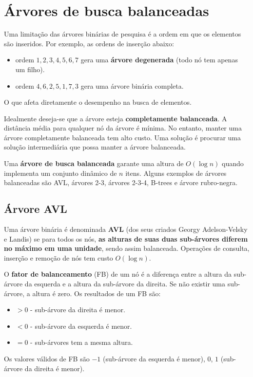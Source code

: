 \section{Árvores de busca balanceadas}

Uma limitação das árvores binárias de pesquisa é a ordem em que os elementos
são inseridos. Por exemplo, as ordens de inserção abaixo:
\begin{itemize}
\item ordem $1, 2, 3, 4, 5, 6, 7$ gera uma {\bf árvore degenerada} (todo nó
tem apenas um filho).
\item ordem $4, 6, 2, 5, 1, 7, 3$ gera uma árvore binária completa.
\end{itemize}
O que afeta diretamente o desempenho na busca de elementos.

Idealmente deseja-se que a árvore esteja {\bf completamente balanceada}.
A distância média para qualquer nó da árvore é mínima.
No entanto, manter uma árvore completamente balanceada tem alto custo.
Uma solução é procurar uma solução intermediária que possa manter a árvore
balanceada.

Uma {\bf árvore de busca balanceada} garante uma altura de $O(\log n)$
quando implementa um conjunto dinâmico de $n$ itens.
Alguns exemplos de árvores balanceadas são AVL, árvores 2-3, árvores 2-3-4,
B-trees e árvore rubro-negra.

\subsection{Árvore AVL}

Uma árvore binária é denominada {\bf AVL} (dos seus criados Georgy
Adelson-Velsky e Landis) se para todos os nós, {\bf as alturas de suas duas
sub-árvores diferem no máximo em uma unidade}, sendo assim balanceada.
Operações de consulta, inserção e remoção de nós tem custo $O(\log n)$.

O {\bf fator de balanceamento} (FB) de um nó é a diferença entre
a altura da sub-árvore da esquerda e a altura da sub-árvore da direita.
Se não existir uma sub-árvore, a altura é zero.
Os resultados de um FB são:
\begin{itemize}
\item $> 0$ - sub-árvore da direita é menor.
\item $< 0$ - sub-árvore da esquerda é menor.
\item $= 0$ - sub-árvores tem a mesma altura.
\end{itemize}
Os valores válidos de FB são $-1$ (sub-árvore da esquerda é menor), $0$, $1$
(sub-árvore da direita é menor).

